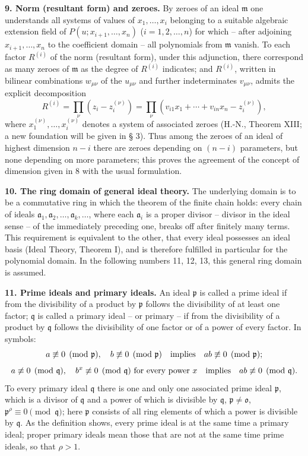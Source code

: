 \documentclass[11pt]{article}
\providecommand{\frakm}{\mathfrak m}
\providecommand{\frakp}{\mathfrak p}
\providecommand{\frakq}{\mathfrak q}
\providecommand{\fraka}{\mathfrak a}
\providecommand{\frako}{\mathfrak o}
\begin{document}
\textbf{9. Norm (resultant form) and zeroes.} By zeroes of an ideal $\frakm$ one understands all systems of values of $x_1,\ldots,x_i$ belonging to a suitable algebraic extension field of $P(u;x_{i+1},\ldots,x_n)$ ($i=1,2,\ldots,n$) for which -- after adjoining $x_{i+1},\ldots,x_n$ to the coefficient domain -- all polynomials from $\frakm$ vanish. To each factor $R^{(i)}$ of the norm (resultant form), under this adjunction, there correspond as many zeroes of $\frakm$ as the degree of $R^{(i)}$ indicates; and $R^{(i)}$, written in bilinear combinations $w_{\mu\nu}$ of the $u_{\mu\nu}$ and further indeterminates $v_{\mu\nu}$, admits the explicit decomposition
\begin{equation}
 R^{(i)}=\prod_\nu (z_i-z_i^{(\nu)})
 =\prod_\nu (v_{i1}x_1+\cdots+v_{in}x_n - z_i^{(\nu)}), \tag{5}
\end{equation}
where $x_1^{(\nu)},\ldots,x_i^{(\nu)}$ denotes a system of associated zeroes (H.-N., Theorem XIII; a new foundation will be given in § 3). Thus among the zeroes of an ideal of highest dimension $n-i$ there are zeroes depending on $(n-i)$ parameters, but none depending on more parameters; this proves the agreement of the concept of dimension given in 8 with the usual formulation.

\textbf{10. The ring domain of general ideal theory.} The underlying domain is to be a commutative ring in which the theorem of the finite chain holds: every chain of ideals $\fraka_1,\fraka_2,\ldots,\fraka_k,\ldots$, where each $\fraka_i$ is a proper divisor -- divisor in the ideal sense -- of the immediately preceding one, breaks off after finitely many terms. This requirement is equivalent to the other, that every ideal possesses an ideal basis (Ideal Theory, Theorem I), and is therefore fulfilled in particular for the polynomial domain. In the following numbers 11, 12, 13, this general ring domain is assumed.

\textbf{11. Prime ideals and primary ideals.} An ideal $\frakp$ is called a prime ideal if from the divisibility of a product by $\frakp$ follows the divisibility of at least one factor; $\frakq$ is called a primary ideal -- or primary -- if from the divisibility of a product by $\frakq$ follows the divisibility of one factor or of a power of every factor. In symbols:
\[
 a\not\equiv0\pmod{\frakp},\quad b\not\equiv0\pmod{\frakp}\quad\hbox{implies}\quad ab\not\equiv0\pmod{\frakp};
\]
\[
 a\not\equiv0\pmod{\frakq},\quad b^x\not\equiv0\pmod{\frakq}\ \hbox{for every power }x\quad\hbox{implies}\quad ab\not\equiv0\pmod{\frakq}.
\]
To every primary ideal $\frakq$ there is one and only one associated prime ideal $\frakp$, which is a divisor of $\frakq$ and a power of which is divisible by $\frakq$, $\frakp\ne\frako$, $\frakp^\rho\equiv0\pmod{\frakq}$; here $\frakp$ consists of all ring elements of which a power is divisible by $\frakq$. As the definition shows, every prime ideal is at the same time a primary ideal; proper primary ideals mean those that are not at the same time prime ideals, so that $\rho>1$.
\end{document}
